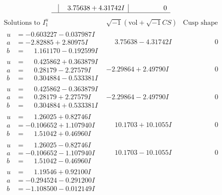 \documentclass[1p]{elsarticle_modified}
\theoremstyle{definition}
\newcommand{\I}{\sqrt{-1}}
\begin{document}
$$\begin{array}{c|c|c}
 & \phantom{-}3.75638 + 4.31742 I & \phantom{-0.000000 } 0\\
 \hline 
 \end{array}$$\newpage$$\begin{array}{c|c|c}  
\text{Solutions to }I^u_{1}& \I (\text{vol} + \sqrt{-1}CS) & \text{Cusp shape}\\
 \hline 
\begin{aligned}
u &= -0.603227 - 0.037987 I \\
a &= -2.82885 + 2.80975 I \\
b &= \phantom{-}1.161170 - 0.192599 I\end{aligned}
 & \phantom{-}3.75638 - 4.31742 I & \phantom{-0.000000 } 0 \\ \hline\begin{aligned}
u &= \phantom{-}0.425862 + 0.363879 I \\
a &= \phantom{-}0.28179 - 2.27579 I \\
b &= \phantom{-}0.304884 - 0.533381 I\end{aligned}
 & -2.29864 + 2.49790 I & \phantom{-0.000000 } 0 \\ \hline\begin{aligned}
u &= \phantom{-}0.425862 - 0.363879 I \\
a &= \phantom{-}0.28179 + 2.27579 I \\
b &= \phantom{-}0.304884 + 0.533381 I\end{aligned}
 & -2.29864 - 2.49790 I & \phantom{-0.000000 } 0 \\ \hline\begin{aligned}
u &= \phantom{-}1.26025 + 0.82746 I \\
a &= -0.106652 + 1.107940 I \\
b &= \phantom{-}1.51042 + 0.46960 I\end{aligned}
 & \phantom{-}10.1703 + 10.1055 I & \phantom{-0.000000 } 0 \\ \hline\begin{aligned}
u &= \phantom{-}1.26025 - 0.82746 I \\
a &= -0.106652 - 1.107940 I \\
b &= \phantom{-}1.51042 - 0.46960 I\end{aligned}
 & \phantom{-}10.1703 - 10.1055 I & \phantom{-0.000000 } 0 \\ \hline\begin{aligned}
u &= \phantom{-}1.19546 + 0.92100 I \\
a &= -0.294524 - 0.291200 I \\
b &= -1.108500 - 0.012149 I\end{aligned}

\end{array}$$
\end{document}
